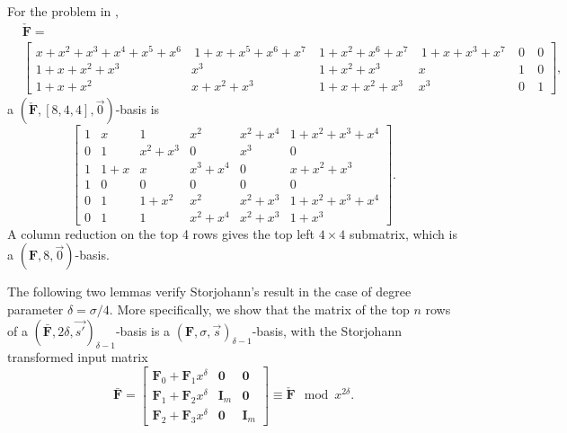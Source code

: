 \begin{exmp}
\label{exm:auxiliaryTransformation}For the problem in ,
\begin{align*}
 & \check{\mathbf{F}}=\\
 & \left[{\begin{array}{cccccr}
x+x^{2}+x^{3}+x^{4}+x^{5}+x^{6} & \ 1+x+x^{5}+x^{6}+x^{7}\  & 1+x^{2}+x^{6}+x^{7} & \ 1+x+x^{3}+x^{7}\  & 0\  & 0\\
1+x+x^{2}+x^{3} & x^{3} & 1+x^{2}+x^{3} & x & 1\  & 0\\
1+x+x^{2} & x+x^{2}+x^{3} & 1+x+x^{2}+x^{3} & x^{3} & 0\  & 1\end{array}}\right],\end{align*}
 a $\left(\check{\mathbf{F}},\left[8,4,4\right],\vec{0}\right)$-basis
is \[
\left[\begin{array}{rccc|cc}
1 & x & 1 & x^{2} & x^{2}+x^{4} & 1+x^{2}+x^{3}+x^{4}\\
0 & 1 & x^{2}+x^{3} & 0 & x^{3} & 0\\
1 & 1+x & x & x^{3}+x^{4} & 0 & x+x^{2}+x^{3}\\
1 & 0 & 0 & 0 & 0 & 0\\
\hline 0 & 1 & 1+x^{2} & x^{2} & x^{2}+x^{3} & 1+x^{2}+x^{3}+x^{4}\\
0 & 1 & 1 & x^{2}+x^{4} & x^{2}+x^{3} & 1+x^{3}\end{array}\right].\]
 A column reduction on the top 4 rows gives the top left $4\times4$
submatrix, which is a \textbf{$(\mathbf{F},8,\vec{0})$}-basis. 
\end{exmp}
The following two lemmas verify Storjohann's result in the case of
degree parameter $\delta=\sigma/4$. More specifically, we show that
the matrix of the top $n$ rows of a $(\bar{\mathbf{F}},2\delta,\vec{s'})_{\delta-1}$-basis
is a $\left(\mathbf{F},\sigma,\vec{s}\right)_{\delta-1}$-basis, with
the Storjohann transformed input matrix \begin{equation}
\bar{\mathbf{F}}=\left[\begin{array}{l|cr}
\mathbf{F}_{0}+\mathbf{F}_{1}x^{\delta} & \mathbf{0} & \mathbf{0}\\
\hline \mathbf{F}_{1}+\mathbf{F}_{2}x^{\delta} & \mathbf{I}_{m} & \mathbf{0}\\
\mathbf{F}_{2}+\mathbf{F}_{3}x^{\delta} & \mathbf{0} & \mathbf{I}_{m}\end{array}\right]\equiv\check{\mathbf{F}}\mod x^{2\delta}.\label{eq:storjohannTransformation4parts}\end{equation}


